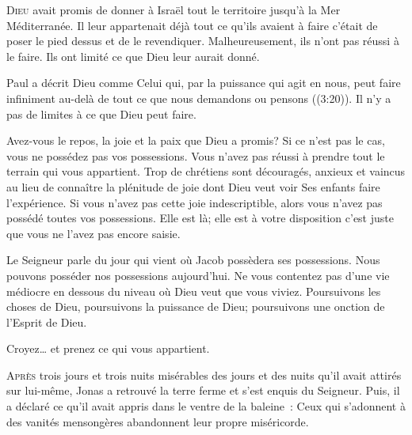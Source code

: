 \lettrine{D}{ieu} avait promis de donner à Israël tout le territoire
 jusqu'à la Mer Méditerranée. Il leur appartenait déjà
 \ocadr tout ce qu'ils avaient à faire c'était de poser le pied dessus
 et de le revendiquer. Malheureusement, ils n'ont pas réussi à le faire.
 Ils ont limité ce que Dieu leur aurait donné. 

Paul a décrit Dieu comme \Og Celui qui, par la puissance qui agit en nous,
 peut faire infiniment au-delà de tout ce que nous demandons ou pensons \Fg{}
 ((3:20)). Il n'y a pas de limites à ce que Dieu peut faire. 


Avez-vous le repos, la joie et la paix que Dieu a promis?
 Si ce n'est pas le cas, vous ne possédez pas vos possessions.
 Vous n'avez pas réussi à prendre tout le terrain qui vous appartient.
 Trop de chrétiens sont découragés, anxieux et vaincus au lieu de connaître
 la plénitude de joie dont Dieu veut voir Ses enfants faire l'expérience.
 Si vous n'avez pas cette joie indescriptible, alors vous n'avez pas possédé
 toutes vos possessions. Elle est là; elle est à votre disposition
 \ocadr c'est juste que vous ne l'avez pas encore saisie. 

Le Seigneur parle du jour qui vient où Jacob possèdera ses possessions.
 Nous pouvons posséder nos possessions aujourd'hui.
 Ne vous contentez pas d'une vie médiocre en dessous du niveau
 où Dieu veut que vous viviez. Poursuivons les choses de Dieu,
 poursuivons la puissance de Dieu;
 poursuivons une onction de l'Esprit de Dieu. 

Croyez\dots{} et prenez ce qui vous appartient. 

\dvrule






\lettrine{A}{près} trois jours et trois nuits misérables
 \ocadr des jours et des nuits qu'il avait attirés sur lui-même,
 Jonas a retrouvé la terre ferme et s'est enquis du Seigneur.
 Puis, il a déclaré ce qu'il avait appris dans le ventre de la baleine~:
 \Og Ceux qui s'adonnent à des vanités mensongères abandonnent
 leur propre miséricorde. \Fg{}  

